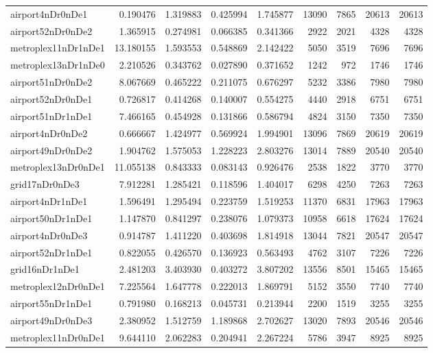 \begin{longtable}{|l|r|r|r|r|r|r|r|r|}
airport4nDr0nDe1 & 0.190476 & 1.319883 & 0.425994 & 1.745877 & 13090 & 7865 & 20613 & 20613 \\
airport52nDr0nDe2 & 1.365915 & 0.274981 & 0.066385 & 0.341366 & 2922 & 2021 & 4328 & 4328 \\
metroplex11nDr1nDe1 & 13.180155 & 1.593553 & 0.548869 & 2.142422 & 5050 & 3519 & 7696 & 7696 \\
metroplex13nDr1nDe0 & 2.210526 & 0.343762 & 0.027890 & 0.371652 & 1242 & 972 & 1746 & 1746 \\
airport51nDr0nDe2 & 8.067669 & 0.465222 & 0.211075 & 0.676297 & 5232 & 3386 & 7980 & 7980 \\
airport52nDr0nDe1 & 0.726817 & 0.414268 & 0.140007 & 0.554275 & 4440 & 2918 & 6751 & 6751 \\
airport51nDr1nDe1 & 7.466165 & 0.454928 & 0.131866 & 0.586794 & 4824 & 3150 & 7350 & 7350 \\
airport4nDr0nDe2 & 0.666667 & 1.424977 & 0.569924 & 1.994901 & 13096 & 7869 & 20619 & 20619 \\
airport49nDr0nDe2 & 1.904762 & 1.575053 & 1.228223 & 2.803276 & 13014 & 7889 & 20540 & 20540 \\
metroplex13nDr0nDe1 & 11.055138 & 0.843333 & 0.083143 & 0.926476 & 2538 & 1822 & 3770 & 3770 \\
grid17nDr0nDe3 & 7.912281 & 1.285421 & 0.118596 & 1.404017 & 6298 & 4250 & 7263 & 7263 \\
airport4nDr1nDe1 & 1.596491 & 1.295494 & 0.223759 & 1.519253 & 11370 & 6831 & 17963 & 17963 \\
airport50nDr1nDe1 & 1.147870 & 0.841297 & 0.238076 & 1.079373 & 10958 & 6618 & 17624 & 17624 \\
airport4nDr0nDe3 & 0.914787 & 1.411220 & 0.403698 & 1.814918 & 13044 & 7821 & 20547 & 20547 \\
airport52nDr1nDe1 & 0.822055 & 0.426570 & 0.136923 & 0.563493 & 4762 & 3107 & 7226 & 7226 \\
grid16nDr1nDe1 & 2.481203 & 3.403930 & 0.403272 & 3.807202 & 13556 & 8501 & 15465 & 15465 \\
metroplex12nDr0nDe1 & 7.225564 & 1.647778 & 0.222013 & 1.869791 & 5152 & 3550 & 7740 & 7740 \\
airport55nDr1nDe1 & 0.791980 & 0.168213 & 0.045731 & 0.213944 & 2200 & 1519 & 3255 & 3255 \\
airport49nDr0nDe3 & 2.380952 & 1.512759 & 1.189868 & 2.702627 & 13020 & 7893 & 20546 & 20546 \\
metroplex11nDr0nDe1 & 9.644110 & 2.062283 & 0.204941 & 2.267224 & 5786 & 3947 & 8925 & 8925 \\

\end{longtable}
